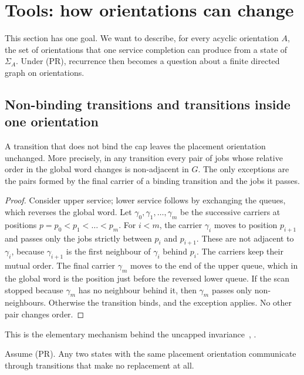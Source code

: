 \documentclass[11pt,a4paper]{article}
\theoremstyle{plain}
\theoremstyle{plain}
\newcommand{\Sg}{\Sigma}
\begin{document}
\section{Tools: how orientations can change}\label{sec:tools}

This section has one goal. We want to describe, for every acyclic orientation $A$, the set of orientations that one service completion can produce from a state of $\Sg_A$. Under (PR), recurrence then becomes a question about a finite directed graph on orientations.

\subsection{Non-binding transitions and transitions inside one orientation}

\begin{lemma}\label{lem:nonbinding}
A transition that does not bind the cap leaves the placement orientation unchanged. More precisely, in any transition every pair of jobs whose relative order in the global word changes is non-adjacent in $G$. The only exceptions are the pairs formed by the final carrier of a binding transition and the jobs it passes.
\end{lemma}

\begin{proof}
Consider upper service; lower service follows by exchanging the queues, which reverses the global word. Let $\gamma_0,\gamma_1,\dots,\gamma_m$ be the successive carriers at positions $p=p_0<p_1<\dots<p_m$. For $i<m$, the carrier $\gamma_i$ moves to position $p_{i+1}$ and passes only the jobs strictly between $p_i$ and $p_{i+1}$. These are not adjacent to $\gamma_i$, because $\gamma_{i+1}$ is the first neighbour of $\gamma_i$ behind $p_i$. The carriers keep their mutual order. The final carrier $\gamma_m$ moves to the end of the upper queue, which in the global word is the position just before the reversed lower queue. If the scan stopped because $\gamma_m$ has no neighbour behind it, then $\gamma_m$ passes only non-neighbours. Otherwise the transition binds, and the exception applies. No other pair changes order.
\end{proof}

This is the elementary mechanism behind the uncapped invariance~\cite[Propositions~2 and~4]{CD2021}, \cite[Lemma~1]{DG2024}.

\begin{lemma}\label{lem:fixed}
Assume (PR). Any two states with the same placement orientation communicate through transitions that make no replacement at all.
\end{lemma}
\end{document}
